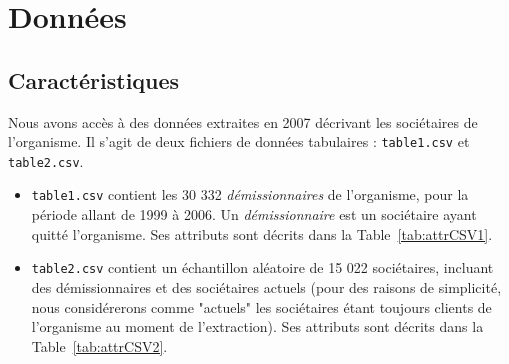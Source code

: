 \documentclass{ceri/sty/rapport}
\begin{document}
\section{Données}

\subsection{Caractéristiques}


Nous avons accès à des données extraites en 2007 décrivant les sociétaires de l'organisme. Il s'agit de deux fichiers de données tabulaires : \texttt{table1.csv} et \texttt{table2.csv}.\\

\begin{itemize}
    \item \texttt{table1.csv} contient les 30 332 \textit{démissionnaires} de l’organisme, pour la période
allant de 1999 à 2006. Un \textit{démissionnaire} est un sociétaire ayant quitté l'organisme. Ses attributs sont décrits dans la Table~\ref{tab:attrCSV1}.\\

    \item \texttt{table2.csv} contient un échantillon aléatoire de 15 022 sociétaires, incluant des démissionnaires et des sociétaires actuels (pour des raisons de simplicité, nous considérerons comme "actuels" les sociétaires étant toujours clients de l'organisme au moment de l'extraction). Ses attributs sont décrits dans la Table~\ref{tab:attrCSV2}.
\end{itemize}
\end{document}
